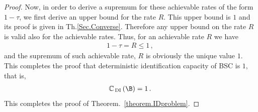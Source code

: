 \begin{proof}
Now, in order to derive a supremum for these achievable rates of the form $1-\tau$, we first derive an upper bound for the rate $R$. This upper bound is $1$ and its proof is given in Th.\ref{Sec.Converse}. Therefore any upper bound on the rate $R$ is valid also for the achievable rates. Thus, for an achievable rate $R$ we have
\begin{align}
    1 - \tau = R \leq 1 \,,\,
\end{align}
and the supremum of such achievable rate, $R$ is obviously the unique value $1$. This completes the proof that deterministic identification capacity of BSC is $1$, that is,
\begin{align}
    \mathbb{C}_{\,\text{DI}} \left( \B \right) = 1 \,.\,
\end{align}
This completes the proof of Theorem.~\ref{theorem.IDproblem}.
\end{proof}
